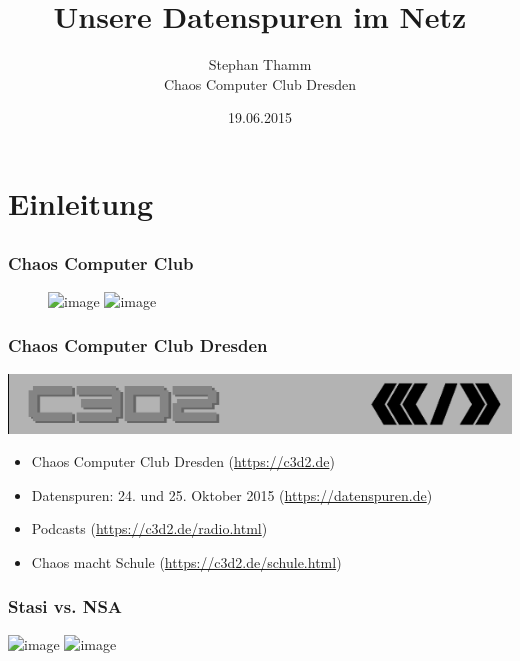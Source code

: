 \documentclass[12pt]{beamer}
\title{Unsere Datenspuren im Netz}
\author{Stephan Thamm\\\large Chaos Computer Club Dresden}
\date{19.06.2015}
\begin{document}
\maketitle

\section{Einleitung}
\subsection{}

\begin{frame}
  \frametitle{Chaos Computer Club}
  \begin{figure}
    \includegraphics<1>[height=0.7\textheight]{img/trojaner.png}
    \includegraphics<2>[height=0.7\textheight]{img/pentabug.jpg}
  \end{figure}
\end{frame}

\begin{frame}
    \frametitle{Chaos Computer Club Dresden}
    \begin{center}
	\includegraphics[height=0.1\textheight]{img/c3d2_logo.png}
    \end{center}
    \begin{itemize}
      \item<1-> Chaos Computer Club Dresden (\url{https://c3d2.de})          
      \item<2-> Datenspuren: 24. und 25. Oktober 2015 (\url{https://datenspuren.de})
      \item<3-> Podcasts (\url{https://c3d2.de/radio.html})
      \item<4-> Chaos macht Schule (\url{https://c3d2.de/schule.html})
    \end{itemize}
\end{frame}

\begin{frame}
    \frametitle{Stasi vs. NSA}
    \includegraphics<2>[height=0.7\textheight]{img/akten1.png}
    \includegraphics<3>[height=0.7\textheight]{img/akten2.png}
\end{frame}
\end{document}
